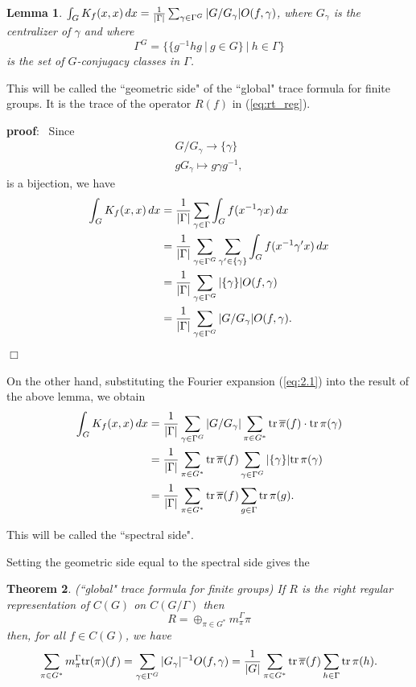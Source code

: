 \documentclass[12pt]{article}
\newtheorem{theorem}{Theorem}
\newtheorem{lemma}[theorem]{Lemma}
\def\pf{{\bf proof}:\ }
\def\qed{$\Box$}
\begin{document}
\begin{lemma}
$\int_G K_f(x,x)\, dx = {1\over |\Gamma |}
\sum_{\gamma\in \Gamma ^G} |G/G_\gamma|O(f,\gamma)$, 
where $G_\gamma$ is the centralizer of $\gamma$ and where
\[
\Gamma ^G = \{\{g^{-1}hg\ |\ g\in G\}\ |\ h\in \Gamma \}
\]
is the set of $G$-conjugacy classes in $\Gamma $.
\end{lemma}

This will be called the ``geometric side" of 
the ``global" trace formula
for finite groups. It is the trace of the
operator $R(f)$ in (\ref{eq:rt_reg}).

\pf
Since
\[
\begin{array}{c}
G/G_\gamma \rightarrow \{\gamma\} \\
g G_\gamma \longmapsto g\gamma g^{-1},
\end{array}
\]
is a bijection, we have
\[
\begin{split}
\int_G K_f(x,x)\, dx 
&= {1\over |\Gamma |}
\sum_{\gamma\in \Gamma } \int_G f(x^{-1}\gamma x)\, dx\\
&= {1\over |\Gamma |}
\sum_{\gamma\in \Gamma ^G} \sum_{\gamma'\in \{\gamma\}}
\int_G f(x^{-1}\gamma' x)\, dx\\
&= {1\over |\Gamma |}
\sum_{\gamma\in \Gamma ^G} |\{\gamma\}| O(f,\gamma)\\
&={1\over |\Gamma |}
\sum_{\gamma\in \Gamma ^G} |G/G_\gamma| O(f,\gamma).
\end{split}
\]
\qed

On the other hand, 
substituting the Fourier expansion (\ref{eq:2.1}) into the 
result of the above lemma, we obtain
\[
\begin{split}
\int_G K_f(x,x)\, dx 
&=
{1\over |\Gamma |}\sum_{\gamma\in \Gamma ^G} |G/G_\gamma| 
\sum_{\pi\in G^*} 
{\rm tr}\,\overline{\pi}(f)\cdot {\rm tr}\,\pi(\gamma)\\
&={1\over |\Gamma |}\sum_{\pi\in G^*} 
{\rm tr}\,\overline{\pi}(f)
\sum_{\gamma\in \Gamma ^G} |\{\gamma\}|{\rm tr}\,\pi(\gamma)\\
&={1\over |\Gamma |}\sum_{\pi\in G^*} 
{\rm tr}\,\overline{\pi}(f)
\sum_{g\in \Gamma } {\rm tr}\,\pi(g).
\end{split}
\]

This will be called the ``spectral side".

Setting the geometric side equal to the spectral side gives the

\begin{theorem} (``global" trace formula for finite groups)
If $R$ is the right regular representation of
$C(G)$ on $C(G/\Gamma )$ then 
\[
R=\oplus_{\pi\in G^*}m^\Gamma _\pi \pi
\]
then, for all $f\in C(G)$, we have
\[
\sum_{\pi\in G^*}m^\Gamma _\pi {\rm tr}(\pi)(f)=
\sum_{\gamma\in \Gamma ^G} |G_\gamma|^{-1}O(f,\gamma)
={1\over |G|}
\sum_{\pi\in G^*} 
{\rm tr}\,\overline{\pi}(f)\sum_{h\in \Gamma } {\rm tr}\,\pi(h).
\]
\end{theorem}
\end{document}
